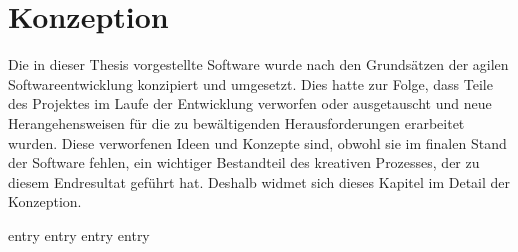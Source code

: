 \chapter{Konzeption}
\label{chap:konzeption}

Die in dieser Thesis vorgestellte Software wurde nach den Grundsätzen der
agilen Softwareentwicklung \cite{agile} konzipiert und umgesetzt.  Dies hatte
zur Folge, dass Teile des Projektes im Laufe der Entwicklung verworfen oder
ausgetauscht und neue Herangehensweisen für die zu bewältigenden
Herausforderungen erarbeitet wurden.  Diese verworfenen Ideen und Konzepte
sind, obwohl sie im finalen Stand der Software fehlen, ein wichtiger
Bestandteil des kreativen Prozesses, der zu diesem Endresultat geführt hat.
Deshalb widmet sich dieses Kapitel im Detail der Konzeption.

{entry}
{entry}
{entry}
{entry}
